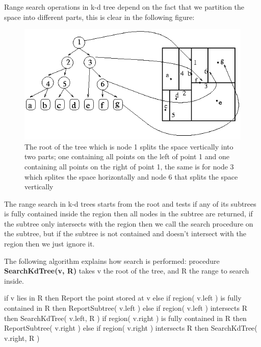 \pagebreak
Range search operations in k-d tree depend on the fact that we partition the space into different parts, this is clear in the following figure:
\begin{figure}[H]
\centering
\includegraphics{Loop/k-d_tree_search1.png}
\caption{The root of the tree which is node 1 splits the space vertically into two parts; one containing all points on the left of point 1 and one containing all points on the right of point 1, the same is for node 3 which splites the space horizontally and node 6 that splits the space vertically }
\label{fig:k-d_tree_search1}
\end{figure}

The range search in k-d trees starts from the root and tests if any of its subtrees is fully contained inside the region then all nodes in the subtree are returned, if the subtree only intersects with the region then we call the search procedure on the subtree, but if the subtree is not contained and doesn't intersect with the region then we just ignore it.

\pagebreak
The following algorithm explains how search is performed:\newline
\noindent procedure {\bf SearchKdTree(v, R)} takes v the root of the tree, and R the range to search inside.

\newline
\noindent if v lies in R\newline
\indent then Report the point stored at v \newline
else\linebreak
\indent if region( v.left ) is fully contained in R\newline
\indent \indent then ReportSubtree( v.left )\newline
\indent else\newline
\indent \indent if region( v.left ) intersects R\newline
\indent \indent \indent then SearchKdTree( v.left, R )\newline
\indent if region( v.right ) is fully contained in R\newline
\indent \indent then ReportSubtree( v.right )\newline
\indent else\newline
\indent \indent if region( v.right ) intersects R\newline
\indent \indent \indent then SearchKdTree( v.right, R )\newline


